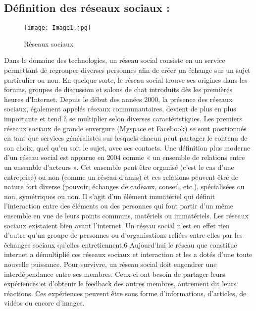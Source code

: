 \documentclass[12pt,a4paper,titlepage]{article}
\begin{document}
\subsection{Définition des réseaux sociaux :}
\begin{figure}[htp]
    \centering
    \texttt{[image: Image1.jpg]}
    \caption{Réseaux sociaux}
    \label{fig:galaxy}
\end{figure}
Dans le domaine des technologies, un réseau social consiste en un service permettant de
regrouper diverses personnes afin de créer un échange sur un sujet particulier ou non. En
quelque sorte, le réseau social trouve ses origines dans les forums, groupes de discussion et
salons de chat introduits dès les premières heures d'Internet. Depuis le début des années 2000,
la présence des réseaux sociaux, également appelés réseaux communautaires, devient de plus
en plus importante et tend à se multiplier selon diverses caractéristiques. Les premiers réseaux
sociaux de grande envergure (Myspace et Facebook) se sont positionnés en tant que services
généralistes sur lesquels chacun peut partager le contenu de son choix, quel qu'en soit le sujet,
avec ses contacts. \newline
Une définition plus moderne d’un réseau social est apparue en 2004 comme « un ensemble de
relations entre un ensemble d’acteurs ». Cet ensemble peut être organisé (c’est le cas d’une
entreprise) ou non (comme un réseau d’amis) et ces relations peuvent être de nature fort diverse
(pouvoir, échanges de cadeaux, conseil, etc.), spécialisées ou non, symétriques ou non. Il s’agit d’un élément immatériel qui définit l’interaction entre des éléments ou des personnes qui font
partir d’un même ensemble en vue de leurs points communs, matériels ou immatériels. \newline
Les réseaux sociaux existaient bien avant l’internet. Un réseau social n’est en effet rien d’autre
qu’un groupe de personnes ou d’organisations reliées entre elles par les échanges sociaux
qu’elles entretiennent.6 Aujourd’hui le réseau que constitue internet a démultiplié ces réseaux
sociaux et interaction et les a dotés d’une toute nouvelle puissance. Pour survivre, un réseau
social doit engendrer une interdépendance entre ses membres. Ceux-ci ont besoin de partager
leurs expériences et d’obtenir le feedback des autres membres, autrement dit leurs réactions.
Ces expériences peuvent être sous forme d’informations, d’articles, de vidéos ou encore
d’images. \newline
\end{document}
